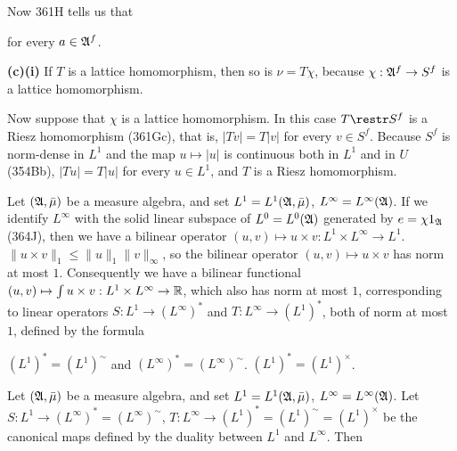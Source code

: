 {
     
Now 361H tells us that
     
     
\noindent for every $a\in\frak A^f$.
     
\medskip
     
{\bf (c)(i)}  If $T$ is a lattice homomorphism, then so is $\nu=T\chi$,
because $\chi:\frak A^f\to S^f$ is a lattice homomorphism.
     
\medskip
     
 Now suppose that $\chi$ is a lattice homomorphism.   In
this case $T\restr S^f$ is a Riesz homomorphism (361Gc), that is,
$|Tv|=T|v|$ for every $v\in S^f$.   Because $S^f$
is norm-dense in $L^1$ and the map $u\mapsto|u|$ is continuous both in
$L^1$
and in $U$ (354Bb), $|Tu|=T|u|$ for every $u\in L^1$, and $T$ is a Riesz
homomorphism.
}%
     
  Let
$(\frak A,\bar\mu)$ be a measure algebra, and set
$L^1=L^1(\frak A,\bar\mu)$, $L^{\infty}=L^{\infty}(\frak A)$.   If we
identify $L^{\infty}$ with the solid linear subspace of
$L^0=L^0(\frak A)$ generated by $e=\chi 1_{\frak A}$ (364J), then we
have a bilinear operator $(u,v)\mapsto u\times v:
L^1\times L^{\infty}\to L^1$.
 $\|u\times v\|_1\le\|u\|_1\|v\|_{\infty}$,
so
the bilinear operator $(u,v)\mapsto u\times v$ has norm at most
$1$.   Consequently we have a bilinear functional
$(u,v)\mapsto\int u\times v:L^1\times L^{\infty}\to\Bbb R$, which also
has norm at most $1$, corresponding to
linear operators $S:L^1\to (L^{\infty})^*$ and $T:L^{\infty}\to(L^1)^*$,
both of norm at most $1$, defined by the formula
     
     
\noindent{}$(L^1)^*=(L^1)^{\sim}$ and
$(L^{\infty})^*=(L^{\infty})^{\sim}$.
 $(L^1)^*=(L^1)^{\times}$.
     
 Let $(\frak A,\bar\mu)$ be a measure algebra, and
set $L^1=L^1(\frak A,\bar\mu)$, $L^{\infty}=L^{\infty}(\frak A)$.   Let
$S:L^1\to(L^{\infty})^*=(L^{\infty})^{\sim}$,
$T:L^{\infty}\to (L^1)^*=(L^1)^{\sim}=(L^1)^{\times}$ be the canonical
maps defined by
the duality between $L^1$ and $L^{\infty}$.   Then
     
